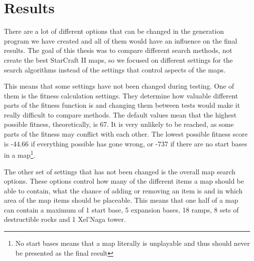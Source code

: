 \chapter{Results}
\label{results}

There are a lot of different options that can be changed in the generation program we have created and all of them would have an influence on the final results. The goal of this thesis was to compare different search methods, not create the best StarCraft II maps, so we focused on different settings for the search algorithms instead of the settings that control aspects of the maps. 

This means that some settings have not been changed during testing. One of them is the fitness calculation settings. They determine how valuable different parts of the fitness function is and changing them between tests would make it really difficult to compare methods. The default values mean that the highest possible fitness, theoretically, is 67. It is very unlikely to be reached, as some parts of the fitness may conflict with each other. The lowest possible fitness score is -44.66 if everything possible has gone wrong, or -737 if there are no start bases in a map\footnote{No start bases means that a map literally is unplayable and thus should never be presented as the final result}.

The other set of settings that has not been changed is the overall map search options. These options control how many of the different items a map should be able to contain, what the chance of adding or removing an item is and in which area of the map items should be placeable. This means that one half of a map can contain a maximum of 1 start base, 5 expansion bases, 18 ramps, 8 sets of destructible rocks and 1 Xel'Naga tower. 




